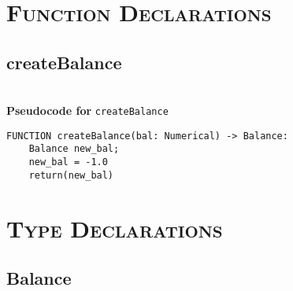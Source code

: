 
\section{\textsc{Function Declarations}}
\clearpage

\subsection{createBalance}
\textbf{\\ Pseudocode for } \texttt{createBalance}
\begin{verbatim}
FUNCTION createBalance(bal: Numerical) -> Balance:
	Balance new_bal;
	new_bal = -1.0
	return(new_bal)
\end{verbatim}


\section{\textsc{Type Declarations}}

\subsection{Balance}
